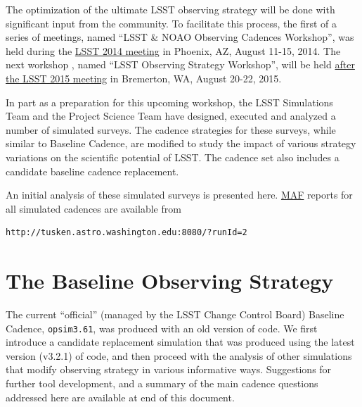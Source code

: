 The optimization of the ultimate LSST observing strategy will be done
with significant input from  the community. To facilitate this
process, the first of a series of meetings, named ``LSST \& NOAO
Observing Cadences Workshop'', was held during the
\href{https://project.lsst.org/meetings/ocw}{LSST 2014 meeting} in
Phoenix, AZ, August 11-15, 2014. The next workshop , named ``LSST
Observing Strategy Workshop'',  will be held
\href{http://lsstsciencecollaborations.github.io/ObservingStrategy/}{after
the LSST 2015 meeting} in Bremerton, WA, August 20-22, 2015.

In part as a preparation for this upcoming workshop, the LSST
Simulations Team and the Project Science Team have designed, executed
and analyzed a number of simulated surveys.  The cadence strategies
for these surveys, while similar to Baseline Cadence, are modified to
study the impact of various strategy variations on the scientific
potential of LSST. The cadence set also includes a candidate baseline
cadence replacement.

An initial analysis of these simulated surveys is presented here.
\href{https://confluence.lsstcorp.org/display/SIM/MAF+documentation}{MAF}
reports for all simulated cadences are available from \begin{verbatim}
http://tusken.astro.washington.edu:8080/?runId=2 \end{verbatim}

\listofopsimdbs

\navigationbar


\section{The Baseline Observing Strategy}
\def\secname{cadexp:baseline}\label{sec:\secname}

The current ``official'' (managed by the LSST Change Control Board)
Baseline Cadence, \texttt{opsim3.61},  was produced with an old version of
\OpSim code. We first introduce a candidate replacement simulation
that was produced using  the latest version (v3.2.1) of \OpSim code,
and then proceed with the analysis of other simulations that modify
observing strategy in various informative ways. Suggestions for
further tool development, and a summary of the main cadence questions
addressed  here are available at end of this document.


